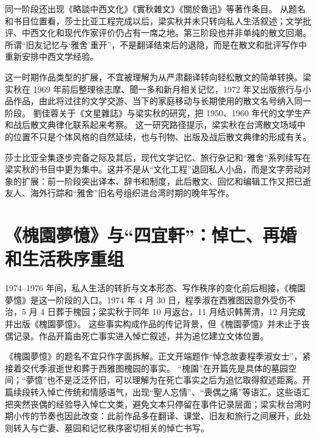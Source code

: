 \documentclass[UTF8,a4paper,zihao=-4,fontset=none]{ctexart}
\begin{document}
同一阶段还出现《略談中西文化》《實秋雜文》《關於魯迅》等著作条目。\autocite{nmtl_liang_chronology} 从题名和书目位置看，莎士比亚工程完成以后，梁实秋并未只转向私人生活叙述；文学批评、中西文化和现代作家评价仍占有一席之地。第三阶段也并非单纯的散文回潮。所谓“旧友记忆与‘雅舍’重开”，不是翻译结束后的退隐，而是在散文和批评写作中重新安排中西文学经验。

这一时期作品类型的扩展，不宜被理解为从严肃翻译转向轻松散文的简单转换。梁实秋在 1969 年前后整理徐志摩、聞一多和新月相关记忆，1972 年又出版旅行与小品作品，由此将过往的文学交游、当下的家庭移动与长期使用的散文名号纳入同一阶段。\autocite{nmtl_liang_chronology} 劉佳蓉关于《文星雜誌》与梁实秋的研究，把 1950、1960 年代的文学生产和战后散文典律化联系起来考察。\autocite{liujiarong2017_wenxing_liang} 这一研究路径提示，梁实秋在台湾散文场域中的位置不只是个体风格的自然延续，也与刊物、出版及战后散文典律的形成有关。

莎士比亚全集逐步完备之际及其后，现代文学记忆、旅行杂记和“雅舍”系列续写在梁实秋的书目中更为集中。这并不是从“文化工程”退回私人小品，而是文字劳动对象的扩展：前一阶段突出译本、辞书和制度，此后散文、回忆和编辑工作又把已逝友人、海外行踪和“雅舍”旧名号组织进台湾时期的晚年写作。

\section{《槐園夢憶》与“四宜軒”：悼亡、再婚和生活秩序重组}

1974--1976 年间，私人生活的转折与文本形态、写作秩序的变化前后相接，《槐園夢憶》是这一阶段的入口。1974 年 4 月 30 日，程季淑在西雅图因意外受伤不治，5 月 4 日葬于槐园；梁实秋于同年 10 月返台，11 月结识韩菁清，12 月完成并出版《槐園夢憶》。\autocite{nmtl_liang_chronology,liang1974_huaiyuan_mengyi} 这些事实构成作品的传记背景，但《槐園夢憶》并未止于丧偶记录。作品开篇由死亡事实进入悼亡叙述，并为追忆建立文体位置。\autocite{liang_huaiyuan_mengyi_fareast_scan_pages}

《槐園夢憶》的题名不宜只作字面拆解。正文开端题作“悼念故妻程季淑女士”\autocite{liang_huaiyuan_mengyi_fareast_scan_pages}，紧接着交代季淑逝世和葬于西雅图槐园的事实。\autocite{liang_huaiyuan_mengyi_fareast_scan_pages} “槐園”在开篇先是具体的墓园空间；“夢憶”也不是泛泛怀旧，可以理解为在死亡事实之后为追忆取得叙述距离。开篇续段转入悼亡传统和情感语气，出现“聖人忘情”\autocite{liang_huaiyuan_mengyi_fareast_scan_pages}、“喪偶之痛”\autocite{liang_huaiyuan_mengyi_fareast_scan_pages}等语汇。这些语汇把突然丧偶的经验导入悼亡文类，避免文本只停留在事件记录层面；梁实秋台湾时期小传的节奏也因此改变：此前作品多在翻译、课堂、旧友和旅行之间展开，此处则转入与亡妻、墓园和记忆秩序密切相关的悼亡书写。
\end{document}
